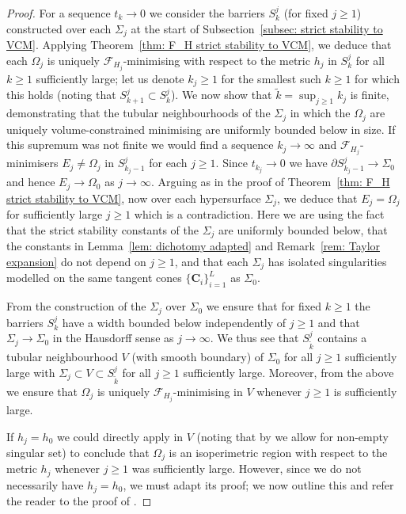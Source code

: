 \documentclass[12pt]{article}
\begin{document}
\begin{proof}
For a sequence $t_k \rightarrow 0$ we consider the barriers $S_k^j$ (for fixed $j \geq 1$) constructed over each $\Sigma_j$ at the start of Subsection~\ref{subsec: strict stability to VCM}. Applying Theorem~\ref{thm: F_H strict stability to VCM}, we deduce that each $\Omega_j$ is uniquely $\mathcal{F}_{H_j}$-minimising with respect to the metric $h_j$ in $S_k^j$ for all $k \geq 1$ sufficiently large; let us denote $k_j \geq 1$ for the smallest such $k \geq 1$ for which this holds (noting that $S_{k+1}^j \subset S_k^j$). We now show that $\tilde{k} = \sup_{j \geq 1} k_j$ is finite, demonstrating that the tubular neighbourhoods of the $\Sigma_j$ in which the $\Omega_j$ are uniquely volume-constrained minimising are uniformly bounded below in size. If this supremum was not finite we would find a sequence $k_j \rightarrow \infty$ and $\mathcal{F}_{H_j}$-minimisers $E_j \neq \Omega_j$ in $S_{k_j-1}^j$ for each $j \geq 1$. Since $t_{k_j} \rightarrow 0$ we have $\partial S_{k_j -1}^j \rightarrow \Sigma_0$ and hence $E_j \rightarrow \Omega_0$ as $j \rightarrow \infty$. Arguing as in the proof of Theorem~\ref{thm: F_H strict stability to VCM}, now over each hypersurface $\Sigma_j$, we deduce that $E_j = \Omega_j$ for sufficiently large $j \geq 1$ which is a contradiction. Here we are using the fact that the strict stability constants of the $\Sigma_j$ are uniformly bounded below, that the constants in Lemma~\ref{lem: dichotomy adapted} and Remark~\ref{rem: Taylor expansion} do not depend on $j \geq 1$, and that each $\Sigma_j$ has isolated singularities modelled on the same tangent cones $\{\mathbf{C}_i\}_{i = 1}^L$ as $\Sigma_0$.

\bigskip

From the construction of the $\Sigma_j$ over $\Sigma_0$ we ensure that for fixed $k \geq 1$ the barriers $S_k^j$ have a width bounded below independently of $j \geq 1$ and that $\Sigma_j \rightarrow \Sigma_0$ in the Hausdorff sense as $j \rightarrow \infty$. We thus see that $S_{\tilde{k}}^j$ contains a tubular neighbourhood $V$ (with smooth boundary) of $\Sigma_0$ for all $j \geq 1$ sufficiently large with $\Sigma_j \subset V \subset S_{\tilde{k}}^j$ for all $j \geq 1$ sufficiently large. Moreover, from the above we ensure that $\Omega_j$ is uniquely $\mathcal{F}_{H_j}$-minimising in $V$ whenever $j \geq 1$ is sufficiently large.

\bigskip

If $h_j = h_0$ we could directly apply \cite[Corollary 2]{MN26} in $V$ (noting that by \cite[Remark 2]{MN26} we allow for non-empty singular set) to conclude that $\Omega_j$ is an isoperimetric region with respect to  the metric $h_j$ whenever $j \geq 1$ was sufficiently large. However, since we do not necessarily have $h_j = h_0$, we must adapt its proof; we now outline this and refer the reader to the proof of \cite[Corollary 2]{MN26}.


\end{proof}
\end{document}
